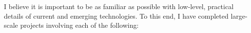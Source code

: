 \documentclass[9pt]{developercv} %
\newcommand{\CPP}
{C\nolinebreak[4]\hspace{-.05em}\raisebox{.22ex}{++ }}
\begin{document}
\vspace{-1em}


I believe it is important to be as familiar as possible with low-level, practical details of current and emerging technologies. %
To this end, I have completed large-scale projects involving each of the following:

\vspace{.5em}




\end{document}
